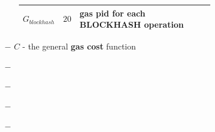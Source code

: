 \documentclass{article}
\begin{document}
\begin{itemize}
\begin{itemize}
\begin{table}[ht!]
\begin{center}
\begin{tabular}{l r p{0.71\linewidth}}
                    $G_{blockhash}$ & $20$ & gas pid for each BLOCKHASH operation\\
                \hline
            \end{tabular}
        \end{center}
    \end{table}
    \end{itemize}
    \item[$-$] $C$  - the general \textbf{gas cost}  function 
    \item[$-$] 
    \item[$-$] 
    \item[$-$] 
    \item[$-$] 
\end{itemize}
\end{document}
